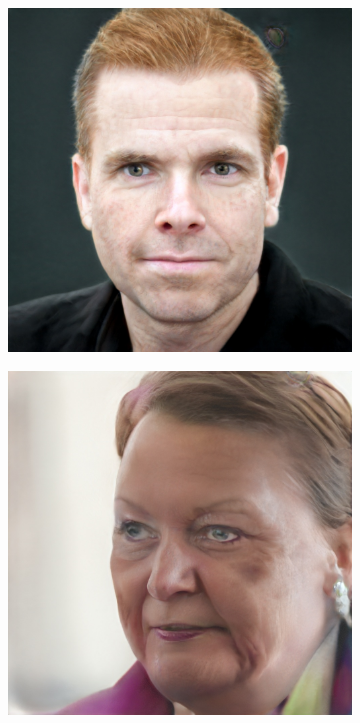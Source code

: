 \begin{figure}
    \begin{subfigure}[b]{0.24\textwidth}
        \includegraphics[width=\textwidth]{fig/stylegan/faceedit/inger-gender}
    \end{subfigure}
    \begin{subfigure}[b]{0.24\textwidth}
        \includegraphics[width=\textwidth]{fig/stylegan/faceedit/lars-gender}

\end{subfigure}
\end{figure}
